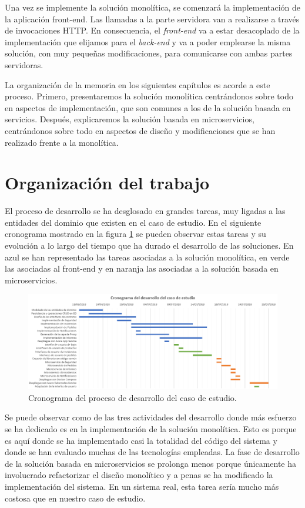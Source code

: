 \documentclass[11pt,spanish,listoffigures]{tfgetsinf}
\begin{document}
Una vez se implemente la solución monolítica, se comenzará la implementación de la aplicación front-end. Las llamadas a la parte servidora van a realizarse a través de invocaciones HTTP. En consecuencia, el \textit{front-end} va a estar desacoplado de la implementación que elijamos para el \textit{back-end} y va a poder emplearse la misma solución, con muy pequeñas modificaciones, para comunicarse con ambas partes servidoras.

La organización de la memoria en los siguientes capítulos es acorde a este proceso. Primero, presentaremos la solución monolítica centrándonos sobre todo en aspectos de implementación, que son comunes a los de la solución basada en servicios. Después, explicaremos la solución basada en microservicios, centrándonos sobre todo en aspectos de diseño y modificaciones que se han realizado frente a la monolítica.

\section{Organización del trabajo}

El proceso de desarrollo se ha desglosado en grandes tareas, muy ligadas a las entidades del dominio que existen en el caso de estudio. En el siguiente cronograma mostrado en la figura \ref{fig:Cronograma} se pueden observar estas tareas y su evolución a lo largo del tiempo que ha durado el desarrollo de las soluciones. En azul se han representado las tareas asociadas a la solución monolítica, en verde las asociadas al front-end y en naranja las asociadas a la solución basada en microservicios.

\begin{figure}[h]
\centering
\includegraphics[scale=0.5]{Cronograma}
\caption{Cronograma del proceso de desarrollo del caso de estudio.}
\label{fig:Cronograma}
\end{figure}

Se puede observar como de las tres actividades del desarrollo donde más esfuerzo se ha dedicado es en la implementación de la solución monolítica. Esto es porque es aquí donde se ha implementado casi la totalidad del código del sistema y donde se han evaluado muchas de las tecnologías empleadas. La fase de desarrollo de la solución basada en microservicios se prolonga menos porque únicamente ha involucrado refactorizar el diseño monolítico y a penas se ha modificado la implementación del sistema. En un sistema real, esta tarea sería mucho más costosa que en nuestro caso de estudio.
\end{document}
